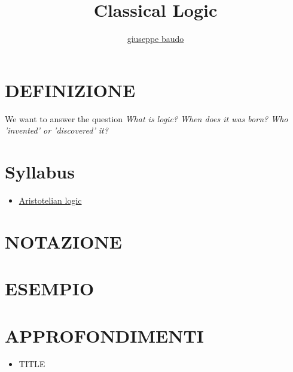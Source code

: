 \documentclass[a4paper,10pt]{article}
\title{Classical Logic}
\author{\href{http://www.baudo.hol.es}{giuseppe baudo}}
\begin{document}
\maketitle

\section{DEFINIZIONE}
We want to answer the question \textit{What is logic? When does it was born? Who 'invented' or 'discovered' it?}

\section{Syllabus}
\begin{itemize}
 \item \href{./AristotelianLogic.html}{Aristotelian logic}
\end{itemize}


\section{NOTAZIONE}

\section{ESEMPIO}

\section{APPROFONDIMENTI}
\begin{itemize}
 \item TITLE
\end{itemize}
\end{document}

